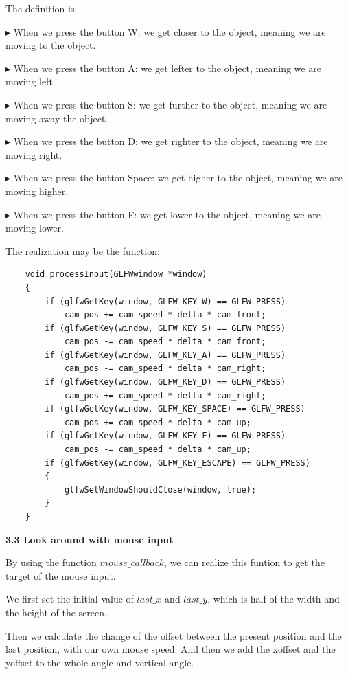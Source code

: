 \documentclass[acmtog]{acmart}
\begin{document}
The definition is:

$\blacktriangleright$ When we press the button W: we get closer to the object, meaning we are moving to the object.

$\blacktriangleright$ When we press the button A: we get lefter to the object, meaning we are moving left.

$\blacktriangleright$ When we press the button S: we get further to the object, meaning we are moving away the object.

$\blacktriangleright$ When we press the button D: we get righter to the object, meaning we are moving right.

$\blacktriangleright$ When we press the button Space: we get higher to the object, meaning we are moving higher.

$\blacktriangleright$ When we press the button F: we get lower to the object, meaning we are moving lower.

The realization may be the function:

\begin{lstlisting}
	void processInput(GLFWwindow *window)
	{
  		if (glfwGetKey(window, GLFW_KEY_W) == GLFW_PRESS)
    		cam_pos += cam_speed * delta * cam_front;
  		if (glfwGetKey(window, GLFW_KEY_S) == GLFW_PRESS)
    		cam_pos -= cam_speed * delta * cam_front;
  		if (glfwGetKey(window, GLFW_KEY_A) == GLFW_PRESS)
    		cam_pos -= cam_speed * delta * cam_right;
  		if (glfwGetKey(window, GLFW_KEY_D) == GLFW_PRESS)
    		cam_pos += cam_speed * delta * cam_right;
  		if (glfwGetKey(window, GLFW_KEY_SPACE) == GLFW_PRESS)
    		cam_pos += cam_speed * delta * cam_up;
  		if (glfwGetKey(window, GLFW_KEY_F) == GLFW_PRESS)
    		cam_pos -= cam_speed * delta * cam_up;
  		if (glfwGetKey(window, GLFW_KEY_ESCAPE) == GLFW_PRESS)
  		{
    		glfwSetWindowShouldClose(window, true);
  		}
	}
\end{lstlisting}

\textbf{3.3 Look around with mouse input}

By using the function $mouse\_callback$, we can realize this funtion to get the target of the mouse input.

We first set the initial value of $last\_x$ and $last\_y$, which is half of the width and the height of the screen.

Then we calculate the change of the offset between the present position and the last position, with our own mouse speed. And then we add the xoffset and the yoffset to the whole angle and vertical angle.
\end{document}
